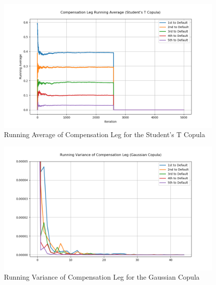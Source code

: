 \documentclass{report}
\theoremstyle{plain}
\theoremstyle{definition}
\begin{document}
\begin{figure}[H]
	\begin{center}
		\includegraphics[width=15cm]{Compensation_Leg_Running_Average_(Student's_T_Copula).png}
		\caption{Running Average of Compensation Leg for the Student's T Copula} 
		\label{Compensation_Leg_Running_Average_(Student's_T_Copula)}
	\end{center}
\end{figure}

\begin{figure}[H]
	\begin{center}
		\includegraphics[width=15cm]{Running_Variance_of_Compensation_Leg_(Gaussian_Copula).png}
		\caption{Running Variance of Compensation Leg for the Gaussian Copula} 
		\label{Running_Variance_of_Compensation_Leg_(Gaussian_Copula)}
	\end{center}
\end{figure}
\end{document}
